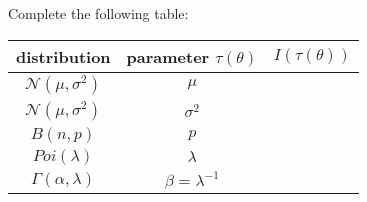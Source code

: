 \begin{ex}
    Complete the following table: 
    \begin{center}
        \begin{tabular}{ccc}
            \hline
            distribution & parameter $\tau(\theta)$ & $I(\tau(\theta))$ \\ \hline
            $\mathcal{N}(\mu, \sigma^2)$ & $\mu$ &  \\
            $\mathcal{N}(\mu, \sigma^2)$ & $\sigma^2$ &  \\
            $B(n,p)$ & $p$ &  \\
            $Poi(\lambda)$ & $\lambda$ &  \\
            $\Gamma(\alpha, \lambda)$ & $\beta=\lambda^{-1}$ &  \\
            \hline
            \end{tabular}
    \end{center}
\end{ex}

